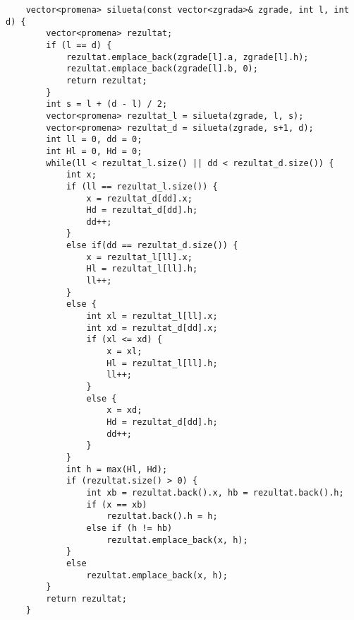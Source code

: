 \documentclass{article}
\begin{document}
\begin{lstlisting}
    vector<promena> silueta(const vector<zgrada>& zgrade, int l, int d) {
        vector<promena> rezultat;
        if (l == d) {
            rezultat.emplace_back(zgrade[l].a, zgrade[l].h);
            rezultat.emplace_back(zgrade[l].b, 0);
            return rezultat;
        }
        int s = l + (d - l) / 2;
        vector<promena> rezultat_l = silueta(zgrade, l, s);
        vector<promena> rezultat_d = silueta(zgrade, s+1, d);
        int ll = 0, dd = 0;
        int Hl = 0, Hd = 0;
        while(ll < rezultat_l.size() || dd < rezultat_d.size()) {
            int x;
            if (ll == rezultat_l.size()) {
                x = rezultat_d[dd].x; 
                Hd = rezultat_d[dd].h;
                dd++;
            }
            else if(dd == rezultat_d.size()) {
                x = rezultat_l[ll].x; 
                Hl = rezultat_l[ll].h;
                ll++;
            } 
            else {
                int xl = rezultat_l[ll].x;
                int xd = rezultat_d[dd].x;
                if (xl <= xd) {
                    x = xl; 
                    Hl = rezultat_l[ll].h;
                    ll++;
                } 
                else {
                    x = xd; 
                    Hd = rezultat_d[dd].h;
                    dd++;
                }
            }
            int h = max(Hl, Hd);
            if (rezultat.size() > 0) {
                int xb = rezultat.back().x, hb = rezultat.back().h;
                if (x == xb)
                    rezultat.back().h = h;
                else if (h != hb)
                    rezultat.emplace_back(x, h);
            }
            else
                rezultat.emplace_back(x, h);
        }
        return rezultat;
    }
\end{lstlisting}
\end{document}
